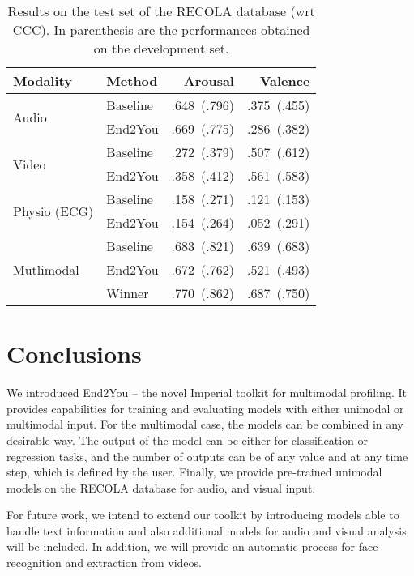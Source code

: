 \documentclass[twoside,11pt]{article}
\begin{document}
\begin{table}[ht]
\centering
\begin{tabular}{l|l|r|r} \toprule\midrule
  \textbf{Modality} & \textbf{Method} & \textbf{Arousal} & \textbf{Valence}  \\ \midrule
 \multirow{2}{*}{Audio} & Baseline & .648~(.796) & .375~(.455) \\
 					    & End2You & .669~(.775) & .286~(.382)\\ \midrule
 \multirow{2}{*}{Video} & Baseline & .272~(.379) & .507~(.612) \\
 					    & End2You & .358~(.412) & .561~(.583)\\ \midrule
\multirow{2}{*}{Physio (ECG)} & Baseline & .158~(.271) & .121~(.153) \\
 					          & End2You & .154~(.264) & .052~(.291) \\ \midrule
\multirow{3}{*}{Mutlimodal}  & Baseline & .683~(.821) & .639~(.683) \\ 
 							 & End2You & .672~(.762) & .521~(.493) \\ 
							 & Winner & .770~(.862) & .687~(.750)   \\ 
\end{tabular}
\caption{Results on the test set of the RECOLA database (wrt CCC). In parenthesis are the performances obtained on the development set.} 
\label{results}
\end{table}

\section{Conclusions}

We introduced End2You -- the novel Imperial toolkit for multimodal profiling. It provides capabilities for training and evaluating models with either unimodal or multimodal input. For the multimodal case, the models can be combined in any desirable way. The output of the model can be either for classification or regression tasks, and the number of outputs can be of any value and at any time step, which is defined by the user. Finally, we provide pre-trained unimodal models on the RECOLA database for audio, and visual input.

For future work, we intend to extend our toolkit by introducing models able to handle text information and also additional models for audio and visual analysis will be included. In addition, we will provide an automatic process for face recognition and extraction from videos.
\end{document}
